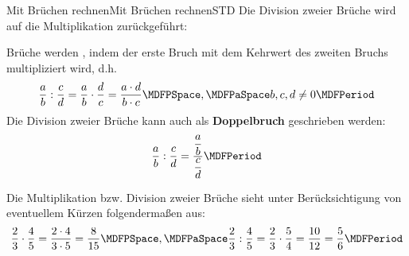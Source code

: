 \begin{MXContent}{Mit Brüchen rechnen}{Mit Brüchen rechnen}{STD}
Die Division zweier Brüche wird auf die Multiplikation zurückgeführt:

\begin{MInfo}
Brüche werden , indem der erste Bruch mit dem Kehrwert des zweiten Bruchs multipliziert wird, d.h.
$$\Mdfrac{a}{b} : \Mdfrac{c}{d} = \Mdfrac{a}{b} \cdot \Mdfrac{d}{c} = \Mdfrac{a\cdot d}{b\cdot c}\MDFPSpace, \MDFPaSpace b,c,d\neq 0 \MDFPeriod$$
Die Division zweier Brüche kann auch als \textbf{Doppelbruch} geschrieben werden:
$$\Mdfrac{a}{b} : \Mdfrac{c}{d} = \Mdfrac{\Mdfrac{a}{b}}{\Mdfrac{c}{d}} \MDFPeriod$$
\end{MInfo}

\begin{MExample}
Die Multiplikation bzw. Division zweier Brüche sieht unter Berücksichtigung von eventuellem Kürzen folgendermaßen aus:
$$\Mdfrac23\cdot \Mdfrac45 = \Mdfrac{2\cdot 4}{3\cdot 5} = \Mdfrac{8}{15}\MDFPSpace, \MDFPaSpace \Mdfrac23 : \Mdfrac45 = \Mdfrac23\cdot \Mdfrac54 = \Mdfrac{10}{12} = \Mdfrac56 \MDFPeriod$$
\end{MExample}


\end{MXContent}


